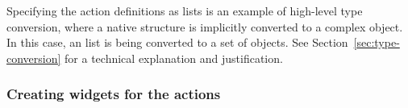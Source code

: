 \documentclass[article,shortnames]{jss}
\begin{document}
Specifying the action definitions as  lists is an example
of  high-level type conversion, where a native  structure
is implicitly converted to a complex  object. In this case,
an  list is being converted to a set of 
objects. See Section~\ref{sec:type-conversion} for
a technical explanation and justification.

\subsubsection{Creating widgets for the actions}
\end{document}
